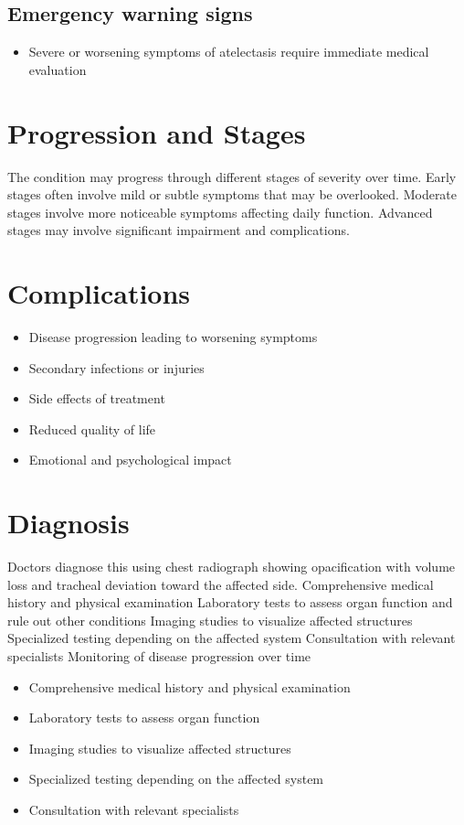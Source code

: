\subsection{Emergency warning signs}
\begin{itemize}[noitemsep]
  \item Severe or worsening symptoms of atelectasis require immediate medical evaluation
\end{itemize}
\section{Progression and Stages}
The condition may progress through different stages of severity over time. Early stages often involve mild or subtle symptoms that may be overlooked. Moderate stages involve more noticeable symptoms affecting daily function. Advanced stages may involve significant impairment and complications.
\section{Complications}
\begin{itemize}[noitemsep]
  \item Disease progression leading to worsening symptoms
  \item Secondary infections or injuries
  \item Side effects of treatment
  \item Reduced quality of life
  \item Emotional and psychological impact
\end{itemize}
\section{Diagnosis}
Doctors diagnose this using chest radiograph showing opacification with volume loss and tracheal deviation toward the affected side. Comprehensive medical history and physical examination Laboratory tests to assess organ function and rule out other conditions Imaging studies to visualize affected structures Specialized testing depending on the affected system Consultation with relevant specialists Monitoring of disease progression over time

\begin{itemize}[noitemsep]
  \item Comprehensive medical history and physical examination
  \item Laboratory tests to assess organ function
  \item Imaging studies to visualize affected structures
  \item Specialized testing depending on the affected system
  \item Consultation with relevant specialists
\end{itemize}

